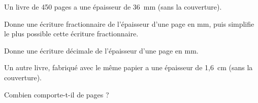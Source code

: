 Un livre de 450 pages a une épaisseur de 36~mm (sans la couverture).
\begin{myenumerate}
\item Donne une écriture fractionnaire de l'épaisseur d'une page en mm, puis simplifie le plus possible cette écriture fractionnaire.
\item Donne une écriture décimale de l'épaisseur d'une page en mm.
\item Un autre livre, fabriqué avec le même papier a une épaisseur de 1,6~cm (sans la couverture).\par Combien comporte-t-il de pages ?
\end{myenumerate}